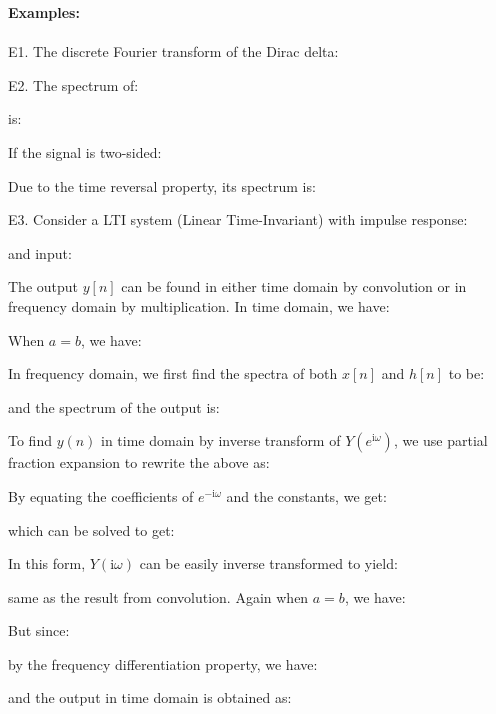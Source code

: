 	\begin{tcolorbox}[colframe=black,colback=white,sharp corners]
	\textbf{{\Large {}}Examples:}\\\\
	E1. The discrete Fourier transform of the Dirac delta:
	
	E2. The spectrum of:
	
	is:
	
	If the signal is two-sided:
	
	Due to the time reversal property, its spectrum is:
	
	E3. Consider a LTI system (Linear Time-Invariant) with impulse response:
	
	and input:
	
	The output $y[n]$ can be found in either time domain by convolution or in frequency domain by multiplication. In time domain, we have:
	
	\end{tcolorbox}
	
	\begin{tcolorbox}[colframe=black,colback=white,sharp corners]
	When $a=b$, we have:
	
	In frequency domain, we first find the spectra of both $x[n]$ and $h[n]$ to be:
	
	and the spectrum of the output is:
	
	To find $y(n)$ in time domain by inverse transform of $Y(e^{\mathrm{i}\omega})$, we use partial fraction expansion to rewrite the above as:
	
	By equating the coefficients of $e^{-\mathrm{i}\omega}$ and the constants, we get:
	
	which can be solved to get:
	
	In this form, $Y(\mathrm{i}\omega)$ can be easily inverse transformed to yield:
	
	same as the result from convolution. Again when $a=b$, we have:
	
	But since:
	
	by the frequency differentiation property, we have:
	
	and the output in time domain is obtained as:
	\end{tcolorbox}
	
